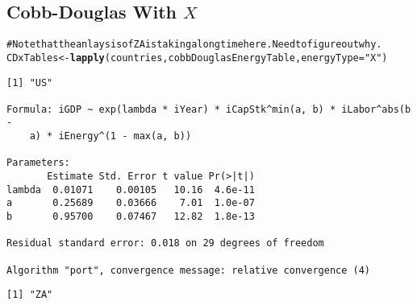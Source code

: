 \documentclass[preprint,authoryear,12pt]{elsarticle}\usepackage{graphicx, color}
\makeatletter
\newcommand{\hlfunctioncall}[1]{\textcolor[rgb]{0.501960784313725,0,0.329411764705882}{\textbf{#1}}}%
\newcommand{\hlstring}[1]{\textcolor[rgb]{0.6,0.6,1}{#1}}%
\newcommand{\hlcomment}[1]{\textcolor[rgb]{0.180392156862745,0.6,0.341176470588235}{#1}}%
\newenvironment{kframe}{%
 \def\at@end@of@kframe{}%
 \ifinner\ifhmode%
  \def\at@end@of@kframe{\end{minipage}}%
  \begin{minipage}{\columnwidth}%
 \fi\fi%
 \def\FrameCommand##1{\hskip\@totalleftmargin \hskip-\fboxsep
 \colorbox{shadecolor}{##1}\hskip-\fboxsep
     \hskip-\linewidth \hskip-\@totalleftmargin \hskip\columnwidth}%
 \MakeFramed {\advance\hsize-\width
   \@totalleftmargin\z@ \linewidth\hsize
   \@setminipage}}%
 {\par\unskip\endMakeFramed%
 \at@end@of@kframe}
\newenvironment{knitrout}{}{} %
\makeatother
\begin{document}
\subsection{Cobb-Douglas With $X$}

\begin{knitrout}
\color{fgcolor}\begin{kframe}
\begin{alltt}
\hlcomment{# Note that the anlaysis of ZA is taking a long time here. Need to figure out why.}
CDxTables <- \hlfunctioncall{lapply}(countries, cobbDouglasEnergyTable, energyType=\hlstring{"X"})
\end{alltt}
\begin{verbatim}
[1] "US"

Formula: iGDP ~ exp(lambda * iYear) * iCapStk^min(a, b) * iLabor^abs(b - 
    a) * iEnergy^(1 - max(a, b))

Parameters:
       Estimate Std. Error t value Pr(>|t|)
lambda  0.01071    0.00105   10.16  4.6e-11
a       0.25689    0.03666    7.01  1.0e-07
b       0.95700    0.07467   12.82  1.8e-13

Residual standard error: 0.018 on 29 degrees of freedom

Algorithm "port", convergence message: relative convergence (4) 
\end{verbatim}


{\ttfamily\noindent\itshape\color{messagecolor}{Waiting for profiling to be done...}}\begin{verbatim}
[1] "ZA"
\end{verbatim}


{\ttfamily\noindent\color{warningcolor}{Warning: longer object length is not a multiple of shorter object length}}

{\ttfamily\noindent\color{warningcolor}{Warning: longer object length is not a multiple of shorter object length}}

{\ttfamily\noindent\color{warningcolor}{Warning: longer object length is not a multiple of shorter object length}}

{\ttfamily\noindent\color{warningcolor}{Warning: longer object length is not a multiple of shorter object length}}

{\ttfamily\noindent\color{warningcolor}{Warning: longer object length is not a multiple of shorter object length}}

{\ttfamily\noindent\color{warningcolor}{Warning: longer object length is not a multiple of shorter object length}}


\end{kframe}
\end{knitrout}
\end{document}
